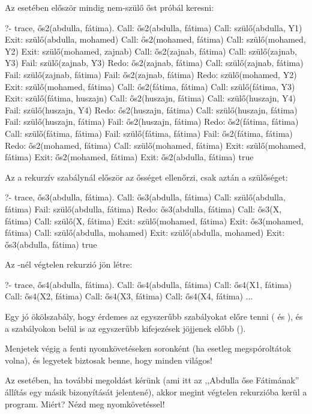 Az  esetében először mindig nem-szülő őst
próbál keresni:
\begin{query}
?- trace, ős2(abdulla, fátima).
Call: ős2(abdulla, fátima)
  Call: szülő(abdulla, Y1)
  Exit: szülő(abdulla, mohamed)
  Call: ős2(mohamed, fátima)
    Call: szülő(mohamed, Y2)
    Exit: szülő(mohamed, zajnab)
    Call: ős2(zajnab, fátima)
      Call: szülő(zajnab, Y3)
      Fail: szülő(zajnab, Y3)
    Redo: ős2(zajnab, fátima)
      Call: szülő(zajnab, fátima)
      Fail: szülő(zajnab, fátima)
    Fail: ős2(zajnab, fátima)
    Redo: szülő(mohamed, Y2)
    Exit: szülő(mohamed, fátima)
    Call: ős2(fátima, fátima)
      Call: szülő(fátima, Y3)
      Exit: szülő(fátima, huszajn)
      Call: ős2(huszajn, fátima)
        Call: szülő(huszajn, Y4)
        Fail: szülő(huszajn, Y4)
      Redo: ős2(huszajn, fátima)
        Call: szülő(huszajn, fátima)
        Fail: szülő(huszajn, fátima)
      Fail: ős2(huszajn, fátima)
    Redo: ős2(fátima, fátima)
      Call: szülő(fátima, fátima)
      Fail: szülő(fátima, fátima)
    Fail: ős2(fátima, fátima)
  Redo: ős2(mohamed, fátima)
    Call: szülő(mohamed, fátima)
    Exit: szülő(mohamed, fátima)
  Exit: ős2(mohamed, fátima)
Exit: ős2(abdulla, fátima)
true
\end{query}

Az  a rekurzív szabálynál először az ősséget
ellenőrzi, csak aztán a szülőséget:
\begin{query}
?- trace, ős3(abdulla, fátima).
Call: ős3(abdulla, fátima)
  Call: szülő(abdulla, fátima)
  Fail: szülő(abdulla, fátima)
Redo: ős3(abdulla, fátima)
  Call: ős3(X, fátima)
    Call: szülő(X, fátima)
    Exit: szülő(mohamed, fátima)
  Exit: ős3(mohamed, fátima)
  Call: szülő(abdulla, mohamed)
  Exit: szülő(abdulla, mohamed)
Exit: ős3(abdulla, fátima)
true
\end{query}

Az -nél végtelen rekurzió jön létre:
\begin{query}
?- trace, ős4(abdulla, fátima).
Call: ős4(abdulla, fátima)
  Call: ős4(X1, fátima)
    Call: ős4(X2, fátima)
      Call: ős4(X3, fátima)
        Call: ős4(X4, fátima)
          ...
\end{query}

Egy jó ökölszabály, hogy érdemes az egyszerűbb
szabályokat előre tenni ( és ), és a
szabályokon belül is az egyszerűbb kifejezések
jöjjenek előbb ().

\begin{problem}
Menjetek végig a fenti nyomkövetéseken soronként (ha
esetleg megspóroltátok volna), és legyetek biztosak
benne, hogy minden világos!
\end{problem}
\begin{problem}
Az  esetében, ha további megoldást kérünk
(ami itt az ,,Abdulla őse Fátimának'' állítás egy
másik bizonyítását jelentené), akkor megint végtelen
rekurzióba kerül a program. Miért?  Nézd meg
nyomkövetéssel!
\end{problem}
